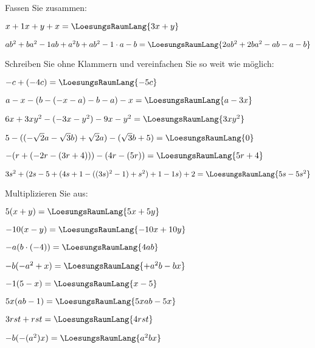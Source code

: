 
\renewcommand{\bbwAufgabenBlockID}{A1G}

\renewcommand{\metaHeaderLine}{Aufgabenblatt}
\renewcommand{\arbeitsblattTitel}{Grundoperationen}



\arbeitsblattHeader{}
Fassen Sie zusammen:
\begin{bbwAufgabenBlock}
\item $x+1x+y+x = \LoesungsRaumLang{3x+y}$
\item $ab^2+ba^2 - 1ab + a^2b + ab^2 - 1\cdot{}a -b  = \LoesungsRaumLang{2ab^2 + 2ba^2 - ab - a - b}$
\end{bbwAufgabenBlock}

Schreiben Sie ohne Klammern und vereinfachen Sie so weit wie möglich:
\begin{bbwAufgabenBlock}
\item $-c+(-4c) = \LoesungsRaumLang{-5c}$
\item $a-x-(b-(-x-a)-b-a)-x = \LoesungsRaumLang{a-3x}$\newpage
\item $6x+3xy^2 -(-3x-y^2)-9x-y^2 = \LoesungsRaumLang{3xy^2}$
\item $5-((-\sqrt{2}a - \sqrt{3}b)+\sqrt{2}a)-(\sqrt{3}b+5)= \LoesungsRaumLang{0}$
\item $-(r+(-2r-(3r+4)))-(4r-(5r))=\LoesungsRaumLang{5r+4}$
\item $3s^2+(2s-5+(4s+1-((3s)^2-1)+s^2)+1-1s)+2 = \LoesungsRaumLang{5s-5s^2}$
\end{bbwAufgabenBlock}
\newpage


Multiplizieren Sie aus:

\begin{bbwAufgabenBlock}
\item $5(x+y)=\LoesungsRaumLang{5x+5y}$
\item $-10(x-y)=\LoesungsRaumLang{-10x+10y}$
\item $-a(b\cdot{}(-4)) = \LoesungsRaumLang{4ab}$
\item $-b(-a^2+x) = \LoesungsRaumLang{+a^2b - bx}$\newpage
\item $-1(5-x)=\LoesungsRaumLang{x-5}$
\item $5x(ab-1)=\LoesungsRaumLang{5xab - 5x}$
\item $3rst + rst=\LoesungsRaumLang{4rst}$
\item $-b(-(a^2)x) = \LoesungsRaumLang{a^2bx}$\newpage
\end{bbwAufgabenBlock}
\newpage

